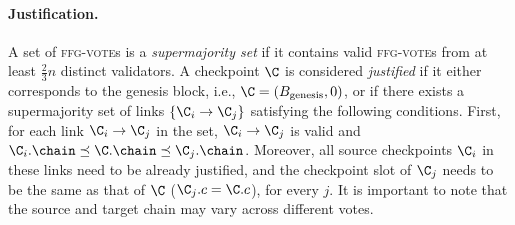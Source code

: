 \paragraph*{Justification.}
A set of \textsc{ffg-vote}s is a \emph{supermajority set} if it contains valid \textsc{ffg-vote}s from at least \(\frac{2}{3}n\) distinct validators.
A checkpoint \(\C\) is considered \emph{justified} if it either corresponds to the genesis block, i.e., \(\C = (B_\text{genesis}, 0)\), or if there exists a supermajority set of links \(\{\C_i \to \C_j\}\) satisfying the following conditions. First,  for each link $\C_i \to \C_j$ in the set, {\(\C_i \to \C_j\) is valid and} \(\C_i.\chain \preceq \C.\chain \preceq \C_j.\chain\). Moreover, all source checkpoints \(\C_i\) in these links need to be already justified, and the checkpoint slot of \(\C_j\) needs to be the same as that of \(\C\) (\(\C_j.c=\C.c\)), for every \(j\). It is important to note that the source and target chain may vary across different votes.


